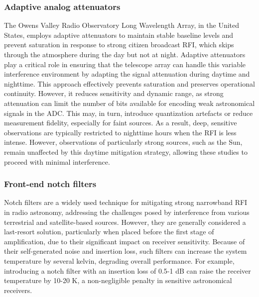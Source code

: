 \subsubsection{Adaptive analog attenuators}

The Owens Valley Radio Observatory Long Wavelength Array, in the United States, employs adaptive attenuators to maintain stable baseline levels and prevent saturation in response to strong citizen broadcast RFI, which skips through the atmosphere during the day but not at night. Adaptive attenuators play a critical role in ensuring that the telescope array can handle this variable interference environment by adapting the signal attenuation during daytime and nighttime. This approach effectively
prevents saturation and preserves operational continuity. However, it reduces sensitivity and dynamic range, as strong attenuation can limit the number of bits available for encoding weak astronomical signals in the ADC. This may, in turn, introduce quantization artefacts or reduce measurement fidelity, especially for faint sources. As a result, deep, sensitive observations are typically restricted to nighttime hours when the RFI is less intense.
However, observations of particularly strong sources, such as the Sun, remain unaffected by this daytime mitigation strategy, allowing these studies to proceed with minimal interference.

\subsubsection{Front-end notch filters}

Notch filters are a widely used technique for mitigating strong narrowband RFI in radio astronomy, addressing the challenges posed by interference from various terrestrial and satellite-based sources.
However, they are generally considered a last-resort solution, particularly when placed before the first stage of amplification, due to their significant impact on receiver sensitivity.
Because of their self-generated noise and insertion loss, such filters can increase the system temperature by several kelvin, degrading overall performance.
For example, introducing a notch filter with an insertion loss of 0.5-1 dB can raise the receiver temperature by 10-20 K, a non-negligible penalty in sensitive astronomical receivers.

